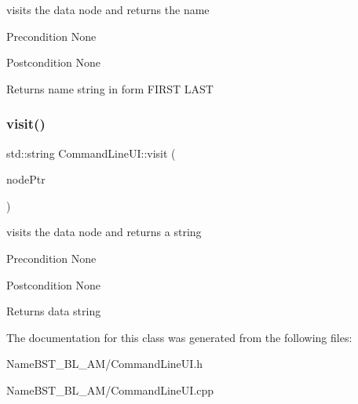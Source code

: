 visits the data node and returns the name \begin{DoxyPrecond}{Precondition}
None 
\end{DoxyPrecond}
\begin{DoxyPostcond}{Postcondition}
None 
\end{DoxyPostcond}
\begin{DoxyReturn}{Returns}
name string in form F\+I\+R\+ST L\+A\+ST 
\end{DoxyReturn}
\mbox{\label{class_command_line_u_i_ad57eb91d3410757e96b2a69194def99a}} 
\subsubsection{\texorpdfstring{visit()}{visit()}}
{\footnotesize\ttfamily std\+::string Command\+Line\+U\+I\+::visit (\begin{DoxyParamCaption}\item[{\hyperlink{class_node_main}{Node\+Main} $\ast$}]{node\+Ptr }\end{DoxyParamCaption})\hspace{0.3cm}{\ttfamily [static]}}

visits the data node and returns a string \begin{DoxyPrecond}{Precondition}
None 
\end{DoxyPrecond}
\begin{DoxyPostcond}{Postcondition}
None 
\end{DoxyPostcond}
\begin{DoxyReturn}{Returns}
data string 
\end{DoxyReturn}


The documentation for this class was generated from the following files\+:\begin{DoxyCompactItemize}
\item 
Name\+B\+S\+T\+\_\+\+B\+L\+\_\+\+A\+M/Command\+Line\+U\+I.\+h\item 
Name\+B\+S\+T\+\_\+\+B\+L\+\_\+\+A\+M/Command\+Line\+U\+I.\+cpp\end{DoxyCompactItemize}
